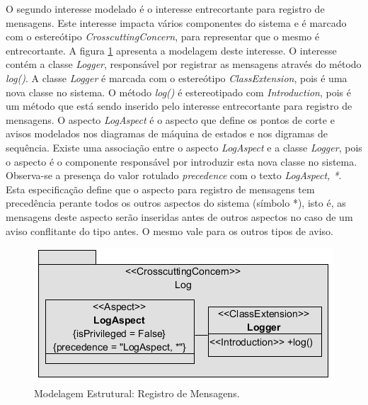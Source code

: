 O segundo interesse modelado é o interesse entrecortante para registro de mensagens. Este interesse impacta vários componentes do sistema e é
marcado com o estereótipo \textit{CrosscuttingConcern}, para representar que o mesmo é entrecortante. A figura \ref{fig:case_study_structural_log}
apresenta a modelagem deste interesse. O interesse contém a classe \textit{Logger}, responsável por registrar as mensagens através do método
\textit{log()}. A classe \textit{Logger} é marcada com o estereótipo \textit{ClassExtension}, pois é uma nova classe no sistema. O método
\textit{log()} é estereotipado com \textit{Introduction}, pois é um método que está sendo inserido pelo interesse entrecortante para registro de mensagens. 
O aspecto \textit{LogAspect} é o aspecto que define os pontos de corte e avisos modelados nos diagramas de máquina de estados e nos digramas de
sequência. Existe uma associação entre o aspecto \textit{LogAspect} e a classe \textit{Logger}, pois o aspecto é o componente responsável por introduzir esta 
nova classe no sistema. Observa-se a presença do valor rotulado \textit{precedence} com o texto \textit{LogAspect, *}. Esta especificação define que o
aspecto para registro de mensagens tem precedência perante todos os outros aspectos do sistema (símbolo *), isto é, as mensagens deste aspecto serão
inseridas antes de outros aspectos no caso de um aviso conflitante do tipo antes. O mesmo vale para os outros tipos de aviso.

  \begin{figure}
	\centering
	\includegraphics{img/case_study_structural_log.png}
	\caption{Modelagem Estrutural: Registro de Mensagens.}\label{fig:case_study_structural_log}
  \end{figure}

